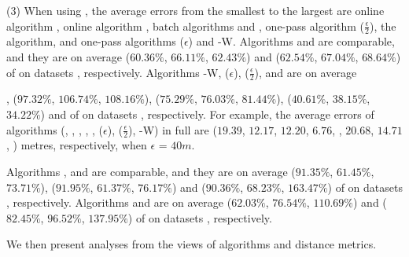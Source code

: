\sstab (3) When using \sed, the average errors from the smallest
to the largest are online algorithm {\dagots}, online algorithm \squishe, batch algorithms \tpa and \dpa,
one-pass algorithm \cised($\frac{\epsilon}{2}$),  the \opt algorithm, and one-pass algorithms \cised(${\epsilon}$) and {\cised-W}.
%
Algorithms \tpa and \dpa are comparable, and they are on average
{($60.36\%$, $66.11\%$, $62.43\%$) and ($62.54\%$, $67.04\%$, $68.64\%$)} of \opt on datasets \dSets, respectively.
Algorithms {\cised-W}, \cised(${\epsilon}$), \cised($\frac{\epsilon}{2}$), \squishe and {\dagots} are on average {, ($97.32\%$, $106.74\%$, $108.16\%$), ($75.29\%$, $76.03\%$, $81.44\%$), ($40.61\%$, $38.15\%$, $34.22\%$) and  of \opt on datasets \dSets, respectively.
%
For example, the average errors of algorithms
(\opt, \tpa, \dpa, \squishe, {\dagots}, \cised(${\epsilon}$), \cised($\frac{\epsilon}{2}$),  \cised-W) in full \mopsi are ($19.39$, $12.17$, $12.20$,  $6.76$, , $20.68$, $14.71$,  ) metres, respectively, when $\epsilon$ = $40m$.
%


Algorithms \tpa, \opwa and \interval are comparable, and they are on average
{($91.35\%$, $61.45\%$, $73.71\%$), ($91.95\%$, $61.37\%$, $76.17\%$) and ($90.36\%$, $68.23\%$, $163.47\%$)} of \opt on datasets \dSets, respectively.
Algorithms \intersec and \dpa are on average ($62.03\%$, $76.54\%$, $110.69\%$) and ($82.45\%$, $96.52\%$, $137.95\%$) of \opt on datasets \dSets, respectively.




We then present analyses from the views of \lsa algorithms and distance metrics.


}
